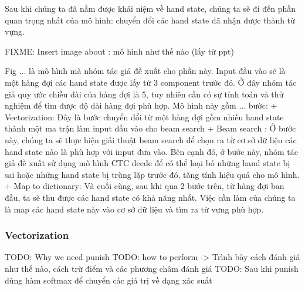       Sau khi chúng ta đã nắm được khái niệm về hand state, chúng ta sẽ đi đến phần quan trọng
      nhất của mô hình: chuyển đổi các hand state đã nhận được thành từ vựng.
      
      FIXME: Insert image about : mô hình như thế nào (lấy từ ppt)

      Fig ... là mô hình mà nhóm tác giả đề xuất cho phần này. Input đầu vào
      sẽ là một hàng đợi các hand state được lấy từ 3 component trước đó. Ở đây nhóm tác giả
      quy ước chiều dài của hàng đợi là 5, tuy nhiên cần có sự tính toán và thử nghiệm để tìm
      được độ dài hàng đợi phù hợp.
      Mô hình này gồm ... bước:
        + Vectorization: Đây là bước chuyển đổi từ một hàng đợi gồm nhiều hand state thành
        một ma trận làm input đầu vào cho beam search
        + Beam search : Ở bước này, chúng ta sẽ thực hiện giải thuật beam search để chọn ra
        từ cơ sở dữ liệu các hand state nào là phù hợp với input đưa vào. Bên cạnh đó, ở bước
        này, nhóm tác giả đề xuất sử dụng mô hình CTC decde để có thể loại bỏ những hand state bị sai
        hoặc những hand state bị trùng lặp trước đó, tăng tính hiệu quả cho mô hình.
        + Map to dictionary: Và cuối cùng, sau khi qua 2 bước trên, từ hàng đợi ban đầu, ta sẽ
        thu được các hand state có khả năng nhất. Việc cần làm của chúng ta là map các hand state
        này vào cơ sở dữ liệu và tìm ra từ vựng phù hợp.
      
    \subsubsection{ Vectorization }
      TODO: Why we need punish
      TODO: how to perform -> Trình bày cách đánh giá như thế nào, cách trừ điểm và các phương châm đánh giá
      TODO: Sau khi punish dùng hàm softmax để chuyển các giá trị về dạng xác suất

